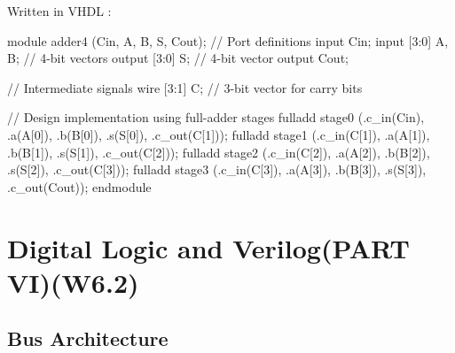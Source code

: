 \documentclass[12pt,openany]{book}
\begin{document}
			      	Written in VHDL : 
			      	\begin{vhdl}
module adder4 (Cin, A, B, S, Cout);
// Port definitions
input Cin;
input [3:0] A, B; // 4-bit vectors
output [3:0] S;   // 4-bit vector
output Cout;

// Intermediate signals
wire [3:1] C; // 3-bit vector for carry bits

// Design implementation using full-adder stages
fulladd stage0 (.c_in(Cin), .a(A[0]), .b(B[0]), .s(S[0]), .c_out(C[1]));
fulladd stage1 (.c_in(C[1]), .a(A[1]), .b(B[1]), .s(S[1]), .c_out(C[2]));
fulladd stage2 (.c_in(C[2]), .a(A[2]), .b(B[2]), .s(S[2]), .c_out(C[3]));
fulladd stage3 (.c_in(C[3]), .a(A[3]), .b(B[3]), .s(S[3]), .c_out(Cout));
endmodule
			      	\end{vhdl}
			      	
			      	
					
			      	\chapter{Digital Logic and Verilog(PART VI)(W6.2)}

					\section{Bus Architecture}
\end{document}
